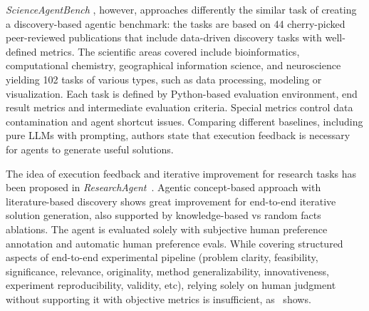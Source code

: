 \documentclass[]{fairmeta}
\newcommand{\dn}[1]{\colorbox{magenta}{\textcolor{white}{Deepak}}\textcolor{magenta}{\textbf{:#1}}}
\begin{document}
\textit{ScienceAgentBench} \citep{chenScienceAgentBenchRigorousAssessment2024}, however, approaches differently the similar task of creating a discovery-based agentic benchmark: the tasks are based on  44 cherry-picked  peer-reviewed publications that include data-driven discovery tasks with well-defined metrics.
The scientific areas covered include bioinformatics, computational chemistry, geographical information science, and neuroscience yielding 102 tasks of various types, such as data processing, modeling or visualization. Each task is defined by Python-based evaluation environment, end result metrics and intermediate evaluation criteria. Special metrics control data contamination and agent shortcut issues. Comparing different baselines, including pure LLMs with prompting, authors state that execution feedback is necessary for agents to generate useful solutions.

The idea of execution feedback and iterative improvement for research tasks has been proposed in \textit{ResearchAgent}~\citep{baekResearchAgentIterativeResearch2024}. Agentic concept-based approach with literature-based discovery shows great improvement for end-to-end iterative solution generation, also supported by knowledge-based vs random facts ablations. 
The agent is evaluated solely with subjective human preference annotation and automatic human preference evals. While covering structured aspects of end-to-end experimental pipeline (problem clarity, feasibility, significance, relevance, originality, method generalizability, innovativeness, experiment reproducibility, validity, etc), relying solely on human judgment without supporting it with objective metrics is insufficient, as~\citet{si2024llmsgeneratenovelresearch} shows.







\end{document}
